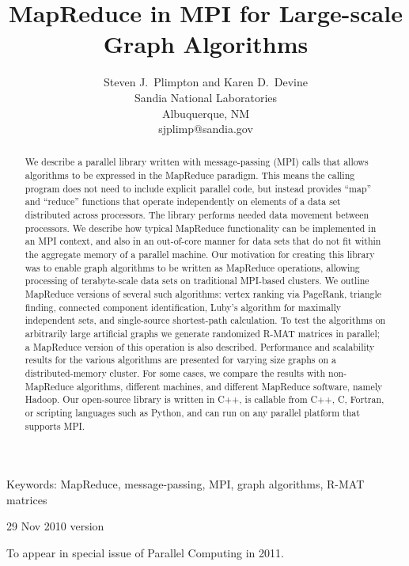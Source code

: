 \documentclass[11pt]{article}
\begin{document}
\title{Map{R}educe in {MPI} for Large-scale Graph Algorithms}

\author{
Steven J.~Plimpton and Karen D.~Devine \\
Sandia National Laboratories \\
Albuquerque, NM \\
sjplimp@sandia.gov
}

\date{}

\maketitle

\centerline{Keywords: MapReduce, message-passing, MPI, graph
algorithms, R-MAT matrices}

\vspace*{0.4in}

\begin{abstract}

We describe a parallel library written with message-passing (MPI)
calls that allows algorithms to be expressed in the MapReduce
paradigm.  This means the calling program does not need to include
explicit parallel code, but instead provides ``map'' and ``reduce''
functions that operate independently on elements of a data set
distributed across processors.  The library performs needed data
movement between processors.  We describe how typical MapReduce
functionality can be implemented in an MPI context, and also in an
out-of-core manner for data sets that do not fit within the aggregate
memory of a parallel machine.  Our motivation for creating this
library was to enable graph algorithms to be written as MapReduce
operations, allowing processing of terabyte-scale data sets on 
traditional MPI-based clusters.  We
outline MapReduce versions of several such algorithms: vertex ranking
via PageRank, triangle finding, connected component identification,
Luby's algorithm for maximally independent sets, and single-source
shortest-path calculation.  To test the algorithms on arbitrarily
large artificial graphs we generate randomized R-MAT matrices in
parallel; a MapReduce version of this operation is also described.
Performance and scalability results for the various algorithms are
presented for varying size graphs on a distributed-memory cluster.
For some cases, we compare the results with non-MapReduce algorithms,
different machines, and different MapReduce software, namely Hadoop.
Our open-source library is written in C++, is callable from C++, C,
Fortran, or scripting languages such as Python, and can run on any
parallel platform that supports MPI.

\end{abstract}

\vspace*{0.4in}

\centerline{29 Nov 2010 version}
\centerline{To appear in special issue of Parallel Computing in 2011.}

\pagebreak











\end{document}

